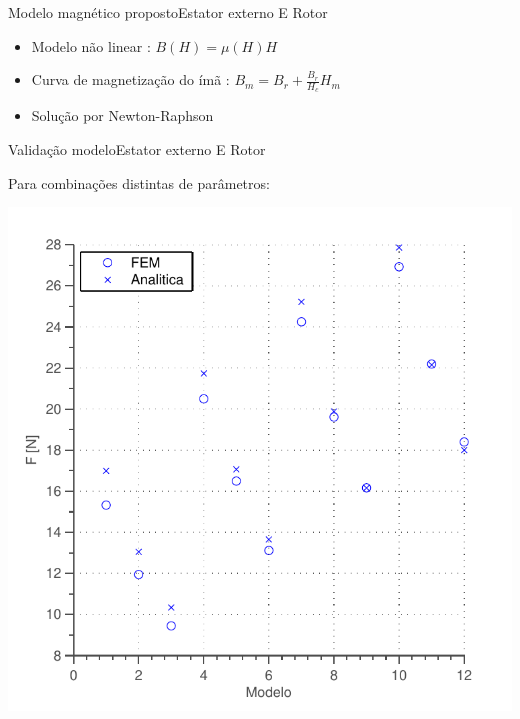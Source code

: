 \documentclass{beamer}
\begin{document}
\begin{frame}{Modelo magnético proposto}{Estator externo E Rotor}
	\begin{itemize}
	\item Modelo não linear : $B(H) = \mu(H) H$
	\item Curva de magnetização do ímã : $B_m = B_r + \frac{B_r}{H_c} H_m$
	\item Solução por Newton-Raphson
	\end{itemize}
	
	\centering{
	}
\end{frame}

\begin{frame}{Validação modelo}{Estator externo E Rotor}

Para combinações distintas de parâmetros:
	
\begin{center}
\includegraphics[width=0.7\linewidth]{../../Dissertacao/Figs/Simulacoes/Passivo2/validacao_passivo_parametros}
\end{center}
\end{frame}

%
%
\end{document}
